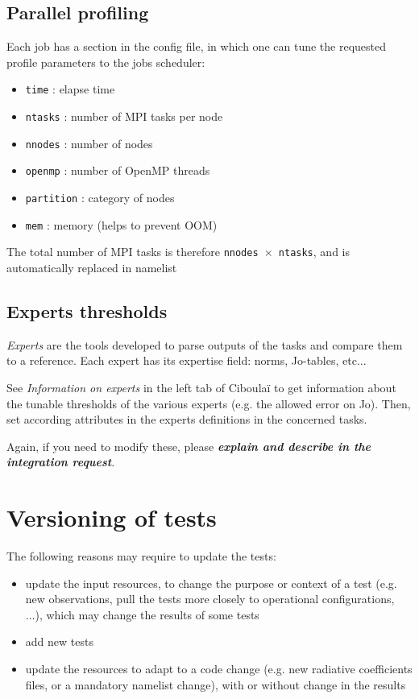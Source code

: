 \documentclass[a4paper,10pt,twoside]{article}
\begin{document}
\subsection{Parallel profiling}
Each job has a section in the config file, in which one can tune the requested profile parameters to the jobs scheduler:
\begin{itemize}
 \item \texttt{time} : elapse time
 \item \texttt{ntasks} : number of MPI tasks per node
 \item \texttt{nnodes} : number of nodes
 \item \texttt{openmp} : number of OpenMP threads
 \item \texttt{partition} : category of nodes
 \item \texttt{mem} : memory (helps to prevent OOM)
\end{itemize}
The total number of MPI tasks is therefore \texttt{nnodes $\times$ ntasks}, and is automatically replaced in namelist


\subsection{Experts thresholds}

\textit{Experts} are the tools developed to parse outputs of the tasks and compare them to a reference. Each expert has its expertise field: norms, Jo-tables, etc...

See \textit{Information on experts} in the left tab of Ciboulaï to get information about the tunable thresholds of the various experts (e.g. the allowed error on Jo).
Then, set according attributes in the experts definitions in the concerned tasks.

Again, if you need to modify these, please \textit{\textbf{explain and describe in the integration request}}.




\newpage
\section{Versioning of tests\label{sect:tests_versioning}}

The following reasons may require to update the tests:
\begin{itemize}
 \item update the input resources, to change the purpose or context of a test (e.g. new observations, pull the tests more closely to operational configurations, ...), which may change the results of some tests
 \item add new tests
 \item update the resources to adapt to a code change (e.g. new radiative coefficients files, or a mandatory namelist change), with or without change in the results
\end{itemize}
\end{document}
